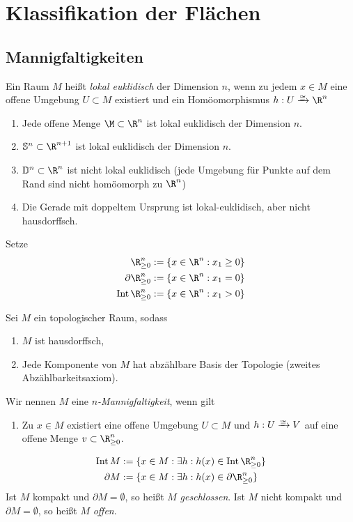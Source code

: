 \chapter{Klassifikation der Flächen}



\section{Mannigfaltigkeiten}


\begin{df}
	Ein Raum $M$ heißt \emph{lokal euklidisch} der Dimension $n$, wenn zu jedem $x \in M$ eine offene Umgebung $U \subset M$ existiert und ein Homöomorphismus $h: U \homeomorphicto \R^n$
\end{df}

\begin{ex}
	\begin{enumerate}[1)]
		\item
			Jede offene Menge $\M \subset \R^n$ ist lokal euklidisch der Dimension $n$.
		\item
			$\S^n \subset \R^{n+1}$ ist lokal euklidisch der Dimension $n$.
		\item
			$\D^n \subset \R^n$ ist nicht lokal euklidisch (jede Umgebung für Punkte auf dem Rand sind nicht homöomorph zu $\R^n$)
		\item
			Die Gerade mit doppeltem Ursprung ist lokal-euklidisch, aber nicht hausdorffsch.
	\end{enumerate}
\end{ex}

Setze
\begin{align*}
	\R_{\ge 0}^n &:= \{ x \in \R^n : x_1 \ge 0 \} \\
	\boundary \R_{\ge 0}^n &:= \{ x \in \R^n : x_1 = 0 \} \\
	\Int \R_{\ge 0}^n &:= \{ x \in \R^n : x_1 > 0 \}
\end{align*}

\begin{df}
	Sei $M$ ein topologischer Raum, sodass
	\begin{enumerate}[1)]
		\item
			$M$ ist hausdorffsch,
		\item
			Jede Komponente von $M$ hat abzählbare Basis der Topologie (zweites Abzählbarkeitsaxiom).
	\end{enumerate}
	Wir nennen $M$ eine \emph{$n$-Mannigfaltigkeit}, wenn gilt
	\begin{enumerate}[1),resume]
		\item
			Zu $x \in M$ existiert eine offene Umgebung $U \subset M$ und $h: U \homeomorphicto V$ auf eine offene Menge $v \subset \R_{\ge 0}^n$.
	\end{enumerate}
	\begin{align*}
		\Int M &:= \{ x \in M : \exists h: h(x) \in \Int \R_{\ge 0}^n \} \\
		\boundary M &:= \{ x \in M : \exists h: h(x) \in \boundary \R_{\ge 0}^n \}
	\end{align*}
	Ist $M$ kompakt und $\partial M = \emptyset$, so heißt $M$ \emph{geschlossen}.
	Ist $M$ nicht kompakt und $\partial M = \emptyset$, so heißt $M$ \emph{offen}.
\end{df}
